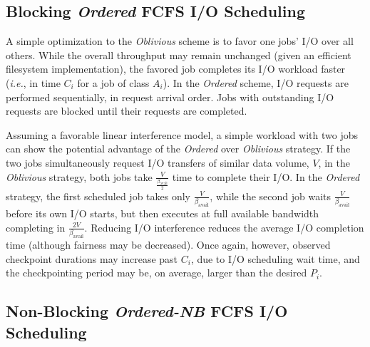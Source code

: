 \documentclass[conference,nofonttune]{IEEEtran}
\newcommand{\ie}[0]{\emph{i.e.}\xspace}
\newcommand{\bandavail}{\beta_{\text{avail}}}
\newcommand{\app}[1]{A_{#1}}
\newcommand{\period}[1]{P_{#1}}
\newcommand{\ckpt}[1]{C_{#1}}
\newcommand{\nocoop}{\emph{Oblivious}\xspace}
\newcommand{\fifoblock}{\emph{Ordered}\xspace}
\newcommand{\fifononblock}{\emph{Ordered-NB}\xspace}
\def\bfifofixed{\fifoblock-Fixed\xspace}
\def\bfifodaly{\fifoblock-Daly\xspace}
\begin{document}
\subsection{Blocking \fifoblock FCFS I/O Scheduling}
\label{sec:fcfsblock}

A simple optimization to the \nocoop scheme is to favor one jobs' I/O over all
others. While the overall throughput may remain unchanged (given an efficient
filesystem implementation), the favored job completes its I/O workload faster
(\ie, in time $\ckpt{i}$ for a job of class $\app{i}$).  In the \fifoblock
scheme, I/O requests are performed sequentially, in request arrival order. Jobs
with outstanding I/O requests are blocked until their requests are completed.

Assuming a favorable linear interference model, a simple workload with two jobs
can show the potential advantage of the \fifoblock over \nocoop strategy.  If
the two jobs simultaneously request I/O transfers of similar data volume, $V$,
in the \nocoop strategy, both jobs take $\frac{V}{\frac{\bandavail}{2}}$ time
to complete their I/O.  In the \fifoblock strategy, the first scheduled job
takes only $\frac{V}{\bandavail}$, while the second job waits
$\frac{V}{\bandavail}$ before its own I/O starts, but then executes at full
available bandwidth completing in $\frac{2V}{\bandavail}$.  Reducing I/O
interference reduces the average I/O completion time (although fairness may be
decreased).  Once again, however, observed checkpoint durations may increase
past $\ckpt{i}$, due to I/O scheduling wait time, and the checkpointing period
may be, on average, larger than the desired $\period{i}$.


\subsection{Non-Blocking \fifononblock FCFS I/O Scheduling}
\label{sec:fcfsnonblock}
\end{document}
